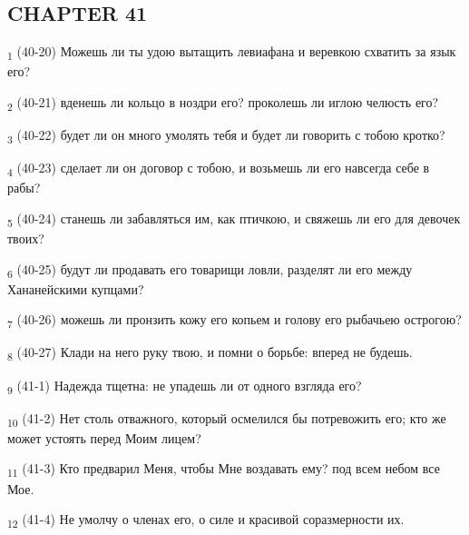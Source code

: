 \subsection{CHAPTER 41}
\begin{tcolorbox}
\textsubscript{1} (40-20) Можешь ли ты удою вытащить левиафана и веревкою схватить за язык его?
\end{tcolorbox}
\begin{tcolorbox}
\textsubscript{2} (40-21) вденешь ли кольцо в ноздри его? проколешь ли иглою челюсть его?
\end{tcolorbox}
\begin{tcolorbox}
\textsubscript{3} (40-22) будет ли он много умолять тебя и будет ли говорить с тобою кротко?
\end{tcolorbox}
\begin{tcolorbox}
\textsubscript{4} (40-23) сделает ли он договор с тобою, и возьмешь ли его навсегда себе в рабы?
\end{tcolorbox}
\begin{tcolorbox}
\textsubscript{5} (40-24) станешь ли забавляться им, как птичкою, и свяжешь ли его для девочек твоих?
\end{tcolorbox}
\begin{tcolorbox}
\textsubscript{6} (40-25) будут ли продавать его товарищи ловли, разделят ли его между Хананейскими купцами?
\end{tcolorbox}
\begin{tcolorbox}
\textsubscript{7} (40-26) можешь ли пронзить кожу его копьем и голову его рыбачьею острогою?
\end{tcolorbox}
\begin{tcolorbox}
\textsubscript{8} (40-27) Клади на него руку твою, и помни о борьбе: вперед не будешь.
\end{tcolorbox}
\begin{tcolorbox}
\textsubscript{9} (41-1) Надежда тщетна: не упадешь ли от одного взгляда его?
\end{tcolorbox}
\begin{tcolorbox}
\textsubscript{10} (41-2) Нет столь отважного, который осмелился бы потревожить его; кто же может устоять перед Моим лицем?
\end{tcolorbox}
\begin{tcolorbox}
\textsubscript{11} (41-3) Кто предварил Меня, чтобы Мне воздавать ему? под всем небом все Мое.
\end{tcolorbox}
\begin{tcolorbox}
\textsubscript{12} (41-4) Не умолчу о членах его, о силе и красивой соразмерности их.
\end{tcolorbox}

